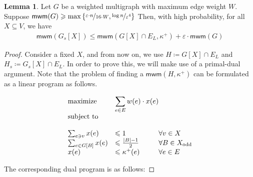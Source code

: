 \documentclass[a4paper,11pt]{article}
\newcommand{\set}[1]{\ensuremath{\left\{ #1 \right\}}}
\newcommand{\eps}{\varepsilon}
\theoremstyle{definition}
\theoremstyle{definition}
\theoremstyle{definition}
\theoremstyle{definition}
\theoremstyle{definition}
\newtheorem{lemma2}[definition2]{Lemma}
\theoremstyle{definition}
\theoremstyle{definition}
\theoremstyle{definition}
\theoremstyle{definition}
\theoremstyle{definition}
\theoremstyle{definition}
\theoremstyle{definition}
\theoremstyle{definition}
\theoremstyle{definition}
\theoremstyle{definition}
\begin{document}
\begin{lemma2}\label{lem:sampling2}
Let $G$ be a weighted multigraph with maximum edge weight $W$. Suppose $\textsf{mwm}(G)\geqslant \max\set{\nicefrac{\eps\cdot n}{16\cdot W},\nicefrac{\log n}{\eps^4}}$ Then, with high probability, for all $X\subseteq V$, we have
\begin{align*}
\textsf{mwm}(G_s[X])\leqslant \textsf{mwm}(G[X]\cap E_L,\kappa^+)+\eps\cdot \textsf{mwm}(G)
\end{align*}
\end{lemma2}
\begin{proof}
Consider a fixed $X$, and from now on, we use $H\coloneqq G[X]\cap E_L$ and $H_s\coloneqq G_s[X]\cap E_L$. In order to prove this, we will make use of a primal-dual argument. Note that the problem of finding a $
\textsf{mwm}(H,\kappa^+)$ can be formulated as a linear program as follows.

\begin{equation}
\begin{array}{ll@{}ll}
\text{maximize}  & \displaystyle\sum\limits_{e\in E} w(e)\cdot x(e) &\\
\text{subject to}& \\ \\
\sum_{e\ni v} x(e)&\leqslant 1 &\forall v\in X\\
\sum_{e\in G[B]} x(e)&\leqslant \frac{|B|-1}{2}& \forall B\in X_{\text{odd}}\\
x(e)&\leqslant \kappa^+(e)& \forall e\in E
\end{array}
\end{equation}

The corresponding dual program is as follows:


\end{proof}
\end{document}
